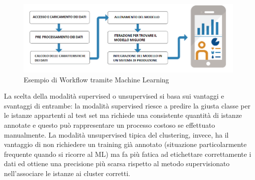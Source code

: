 \begin{figure}[]
	\centering
	\includegraphics[scale=0.55]{images/Workflow_ML.png}
	\caption{Esempio di Workflow tramite Machine Learning}
\end{figure}
La scelta della modalità supervised o unsupervised si basa sui vantaggi e svantaggi di entrambe: la modalità supervised riesce a predire la giusta classe per le istanze appartenti al test set ma richiede una consistente quantità di istanze annotate e questo può rappresentare un processo costoso se effettuato manualmente. La modalità unsupervised tipica del clustering, invece, ha il vantaggio di non richiedere un training già annotato (situazione particolarmente frequente quando si
ricorre al ML) ma fa più fatica ad etichettare correttamente i dati ed ottiene una precisione più scarsa rispetto al metodo supervisionato nell'associare le istanze ai cluster corretti. 

